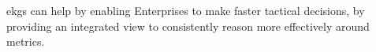 %
%
\Glspl{ekg} can help by enabling Enterprises to make faster tactical decisions, by providing an integrated view to
consistently reason more effectively around metrics.
